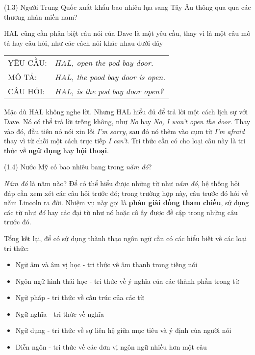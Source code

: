 \vspace{2mm}
\noindent
(1.3) Người Trung Quốc xuất khẩu bao nhiêu lụa sang Tây Âu thông qua qua các thương nhân miền nam?
\vspace{2mm}

HAL cũng cần phân biệt câu nói của Dave là một yêu cầu, thay vì là một câu mô tả hay câu hỏi, như các cách nói khác nhau dưới đây

\begin{tabular}{ l l }
	 YÊU CẦU: & \textit{HAL, open the pod bay door.} \\
	 MÔ TẢ: & \textit{HAL, the pood bay door is open.} \\
	 CÂU HỎI: & \textit{HAL, is the pod bay door open?}
	\end{tabular}
 \label{table:1}

Mặc dù HAL không nghe lời. Nhưng HAL hiểu đủ để trả lời một cách lịch sự với Dave. Nó có thể trả lời trống không, như \textit{No} hay \textit{No, I won't open the door}. Thay vào đó, đầu tiên nó nói xin lỗi \textit{I'm sorry}, sau đó nó thêm vào cụm từ \textit{I'm afraid} thay vì từ chối một cách trực tiếp \textit{I can't}. Tri thức cần có cho loại câu này là tri thức về \textbf{ngữ dụng} hay \textbf{hội thoại}.

\vspace{2mm}
\noindent
(1.4) Nước Mỹ có bao nhiêu bang trong \textit{năm đó}?
\vspace{2mm}

\textit{Năm đó} là năm nào? Để có thể hiểu được những từ như \textit{năm đó}, hệ thống hỏi đáp cần xem xét các câu hỏi trước đó; trong trường hợp này, câu trước đó hỏi về năm Lincoln ra đời. Nhiệm vụ này gọi là \textbf{phân giải đồng tham chiếu}, sử dụng các từ như \textit{đó} hay các đại từ như nó hoặc cô ấy được đề cập trong những câu trước đó.

Tổng kết lại, để có sử dụng thành thạo ngôn ngữ cần có các hiểu biết về các loại tri thức:

\begin{itemize}[noitemsep]
  \item Ngữ âm và âm vị học - tri thức về âm thanh trong tiếng nói
  \item Ngôn ngữ hình thái học - tri thức về ý nghĩa của các thành phần trong từ
  \item Ngữ pháp - tri thức về cấu trúc của các từ
  \item Ngữ nghĩa - tri thức về nghĩa
  \item Ngữ dụng - tri thức về sự liên hệ giữa mục tiêu và ý định của người nói
  \item Diễn ngôn - tri thức về các đơn vị ngôn ngữ nhiều hơn một câu
\end{itemize}

